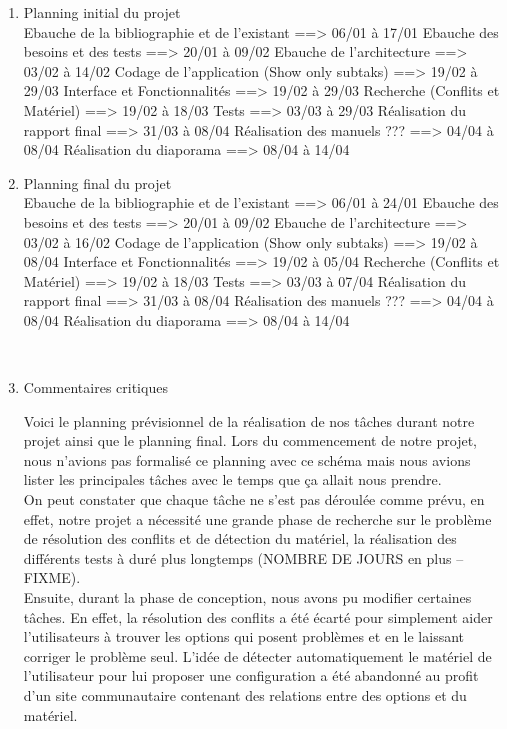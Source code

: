 \documentclass[16pts]{report}
\begin{document}
\begin{enumerate}
	\item Planning initial du projet
	\\
	Ebauche de la bibliographie et de l'existant	==> 06/01 à 17/01
	Ebauche des besoins et des tests				==> 20/01 à 09/02
	Ebauche de l'architecture						==> 03/02 à 14/02
	Codage de l'application	(Show only subtaks)		==> 19/02 à 29/03
		Interface et Fonctionnalités				==> 19/02 à 29/03
		Recherche (Conflits et Matériel)			==> 19/02 à 18/03
		Tests										==> 03/03 à 29/03
	Réalisation du rapport final					==> 31/03 à 08/04
	Réalisation des manuels ???						==> 04/04 à 08/04
	Réalisation du diaporama						==> 08/04 à 14/04


	\item Planning final du projet
	\\
	Ebauche de la bibliographie et de l'existant	==> 06/01 à 24/01
	Ebauche des besoins et des tests				==> 20/01 à 09/02
	Ebauche de l'architecture						==> 03/02 à 16/02
	Codage de l'application	(Show only subtaks)		==> 19/02 à 08/04
		Interface et Fonctionnalités				==> 19/02 à 05/04
		Recherche (Conflits et Matériel)			==> 19/02 à 18/03
		Tests										==> 03/03 à 07/04
	Réalisation du rapport final					==> 31/03 à 08/04
	Réalisation des manuels ???						==> 04/04 à 08/04
	Réalisation du diaporama						==> 08/04 à 14/04

	\\

	\item Commentaires critiques

	Voici le planning prévisionnel de la réalisation de nos tâches durant notre projet ainsi que le planning final. Lors du commencement de notre projet, nous n'avions pas formalisé ce planning avec ce schéma mais nous avions lister les principales tâches avec le temps que ça allait nous prendre.
	\\
	On peut constater que chaque tâche ne s'est pas déroulée comme prévu, en effet, notre projet a nécessité une grande phase de recherche sur le problème de résolution des conflits et de détection du matériel, la réalisation des différents tests à duré plus longtemps (NOMBRE DE JOURS en plus -- FIXME).
	\\
	Ensuite, durant la phase de conception, nous avons pu modifier certaines tâches. En effet, la résolution des conflits a été écarté pour simplement aider l'utilisateurs à trouver les options qui posent problèmes et en le laissant corriger le problème seul. L'idée de détecter automatiquement le matériel de l'utilisateur pour lui proposer une configuration a été abandonné au profit d'un site communautaire contenant des relations entre des options et du matériel.



\end{enumerate}
\end{document}
